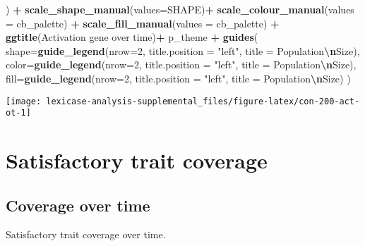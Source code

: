 \documentclass[
]{book}
\newenvironment{Shaded}{\begin{snugshade}}{\end{snugshade}}
\newcommand{\AttributeTok}[1]{\textcolor[rgb]{0.13,0.29,0.53}{#1}}
\newcommand{\DecValTok}[1]{\textcolor[rgb]{0.00,0.00,0.81}{#1}}
\newcommand{\FunctionTok}[1]{\textcolor[rgb]{0.13,0.29,0.53}{\textbf{#1}}}
\newcommand{\NormalTok}[1]{#1}
\newcommand{\SpecialCharTok}[1]{\textcolor[rgb]{0.81,0.36,0.00}{\textbf{#1}}}
\newcommand{\StringTok}[1]{\textcolor[rgb]{0.31,0.60,0.02}{#1}}
\begin{document}
\begin{Shaded}
\begin{Highlighting}[]
\NormalTok{  ) }\SpecialCharTok{+}
  \FunctionTok{scale\_shape\_manual}\NormalTok{(}\AttributeTok{values=}\NormalTok{SHAPE)}\SpecialCharTok{+}
  \FunctionTok{scale\_colour\_manual}\NormalTok{(}\AttributeTok{values =}\NormalTok{ cb\_palette) }\SpecialCharTok{+}
  \FunctionTok{scale\_fill\_manual}\NormalTok{(}\AttributeTok{values =}\NormalTok{ cb\_palette) }\SpecialCharTok{+}
  \FunctionTok{ggtitle}\NormalTok{(}\StringTok{\textquotesingle{}Activation gene over time\textquotesingle{}}\NormalTok{)}\SpecialCharTok{+}
\NormalTok{  p\_theme }\SpecialCharTok{+}
  \FunctionTok{guides}\NormalTok{(}
    \AttributeTok{shape=}\FunctionTok{guide\_legend}\NormalTok{(}\AttributeTok{nrow=}\DecValTok{2}\NormalTok{, }\AttributeTok{title.position =} \StringTok{"left"}\NormalTok{, }\AttributeTok{title =} \StringTok{\textquotesingle{}Population}\SpecialCharTok{\textbackslash{}n}\StringTok{Size\textquotesingle{}}\NormalTok{),}
    \AttributeTok{color=}\FunctionTok{guide\_legend}\NormalTok{(}\AttributeTok{nrow=}\DecValTok{2}\NormalTok{, }\AttributeTok{title.position =} \StringTok{"left"}\NormalTok{, }\AttributeTok{title =} \StringTok{\textquotesingle{}Population}\SpecialCharTok{\textbackslash{}n}\StringTok{Size\textquotesingle{}}\NormalTok{),}
    \AttributeTok{fill=}\FunctionTok{guide\_legend}\NormalTok{(}\AttributeTok{nrow=}\DecValTok{2}\NormalTok{, }\AttributeTok{title.position =} \StringTok{"left"}\NormalTok{, }\AttributeTok{title =} \StringTok{\textquotesingle{}Population}\SpecialCharTok{\textbackslash{}n}\StringTok{Size\textquotesingle{}}\NormalTok{)}
\NormalTok{  )}
\end{Highlighting}
\end{Shaded}

\texttt{[image: lexicase-analysis-supplemental\_files/figure-latex/con-200-act-ot-1]}

\hypertarget{satisfactory-trait-coverage-2}{%
\section{Satisfactory trait coverage}\label{satisfactory-trait-coverage-2}}

\hypertarget{coverage-over-time-5}{%
\subsection{Coverage over time}\label{coverage-over-time-5}}

Satisfactory trait coverage over time.
\end{document}
